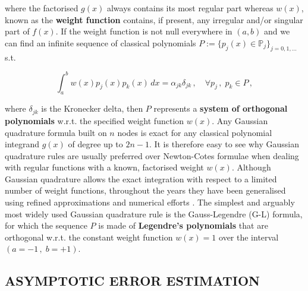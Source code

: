 \documentclass[a4paper, twosided]{book}
\begin{document}
\noindent
where the factorised $g(x)$ always contains its most regular part whereas $w(x)$, known as the \color{poliDarkBlue} \textbf{weight function} \color{black} contains, if present, any irregular and/or singular part of $f(x)$. If the weight function is not null everywhere in $(a,b)$ and we can find an infinite sequence of classical polynomials $P:=\big\{p_j(x)\in\mathbb{P}_j\big\}_{j=0,1,...}$ s.t.

\begin{equation}\label{eq1.6}
    \int_a^b w(x)p_j(x)p_k(x)\,dx = \alpha_{jk}\delta_{jk}\,,\quad\forall p_j\,,\;p_k\in P\,,
\end{equation}

\noindent
where $\delta_{jk}$ is the Kronecker delta, then $P$ represents a \color{poliDarkBlue} \textbf{system of orthogonal polynomials} \color{black} w.r.t. the specified weight function $w(x)$. Any Gaussian quadrature formula built on  $n$ nodes is exact for any classical polynomial integrand $g(x)$ of degree up to $2n-1$. It is therefore easy to see why Gaussian quadrature rules are usually preferred over Newton-Cotes formulae when dealing with regular functions with a known, factorised weight $w(x)$. Although Gaussian quadrature allows the exact integration with respect to a limited number of weight functions, throughout the years they have been generalised using refined approximations and numerical efforts \cite{Gautschi94}. The simplest and arguably most widely used Gaussian quadrature rule is the Gauss-Legendre (G-L) formula, for which the sequence $P$ is made of \color{poliDarkBlue} \textbf{Legendre's polynomials} \color{black} that are orthogonal w.r.t. the constant weight function $w(x)=1$ over the interval $(a=-1\,,\;b=+1)$.

\subsection[Asymptotic error estimation]{\changefont ASYMPTOTIC ERROR ESTIMATION \color{black}}\label{SubSec1.2.3}
\end{document}

